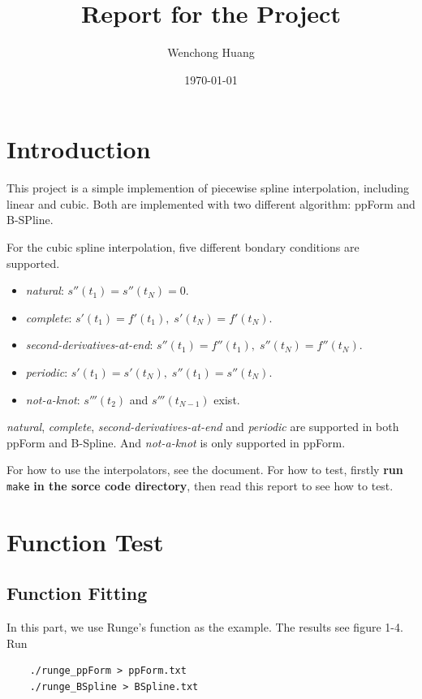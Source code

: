 \documentclass[11pt,en]{elegantpaper}
\title{Report for the Project}
\author{Wenchong Huang}
\date{\today}
\begin{document}
\maketitle

\section{Introduction}

This project is a simple implemention of piecewise spline interpolation, including linear and cubic. Both are implemented with two different algorithm: ppForm and B-SPline.

For the cubic spline interpolation, five different bondary conditions are supported.

\begin{itemize}
    \item \textit{natural}: $s''(t_1)=s''(t_N)=0$.
    \item \textit{complete}: $s'(t_1)=f'(t_1),\;s'(t_N)=f'(t_N)$.
    \item \textit{second-derivatives-at-end}: $s''(t_1)=f''(t_1),\;s''(t_N)=f''(t_N)$.
    \item \textit{periodic}: $s'(t_1)=s'(t_N),\;s''(t_1)=s''(t_N)$.
    \item \textit{not-a-knot}: $s'''(t_2)$ and $s'''(t_{N-1})$ exist.
\end{itemize}

\textit{natural}, \textit{complete}, \textit{second-derivatives-at-end} and \textit{periodic} are supported in both ppForm and B-Spline. And \textit{not-a-knot} is only supported in ppForm.

For how to use the interpolators, see the document. For how to test, firstly \textbf{run} \verb|make| \textbf{in the sorce code directory}, then read this report to see how to test.

\section{Function Test}

\subsection{Function Fitting}

In this part, we use Runge's function as the example. The results see figure 1-4. Run

\begin{lstlisting}
    ./runge_ppForm > ppForm.txt
    ./runge_BSpline > BSpline.txt
\end{lstlisting}
\end{document}
